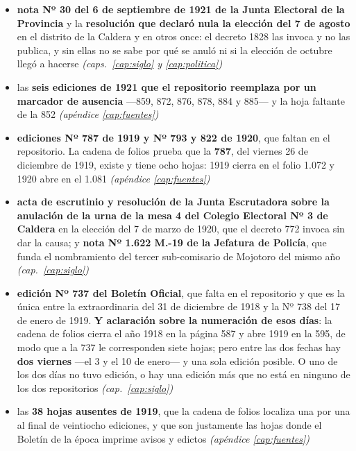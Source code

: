 \begin{itemize}[leftmargin=*]
\item \textbf{nota Nº 30 del 6 de septiembre de 1921 de la Junta Electoral de la Provincia} y la \textbf{resolución que declaró nula la elección del 7 de agosto} en el distrito de la Caldera y en otros once: el decreto 1828 las invoca y no las publica, y sin ellas no se sabe por qué se anuló ni si la elección de octubre llegó a hacerse \textit{(caps.\ \ref{cap:siglo} y \ref{cap:politica})}
\item las \textbf{seis ediciones de 1921 que el repositorio reemplaza por un marcador de ausencia} ---859, 872, 876, 878, 884 y 885--- y la hoja faltante de la 852 \textit{(apéndice \ref{cap:fuentes})}

\item \textbf{ediciones Nº 787 de 1919 y Nº 793 y 822 de 1920}, que faltan en el repositorio. La cadena de folios prueba que la \textbf{787}, del viernes 26 de diciembre de 1919, existe y tiene ocho hojas: 1919 cierra en el folio 1.072 y 1920 abre en el 1.081 \textit{(apéndice \ref{cap:fuentes})}
\item \textbf{acta de escrutinio y resolución de la Junta Escrutadora sobre la anulación de la urna de la mesa 4 del Colegio Electoral Nº 3 de Caldera} en la elección del 7 de marzo de 1920, que el decreto 772 invoca sin dar la causa; y \textbf{nota Nº 1.622 M.-19 de la Jefatura de Policía}, que funda el nombramiento del tercer sub-comisario de Mojotoro del mismo año \textit{(cap.\ \ref{cap:siglo})}

\item \textbf{edición Nº 737 del Boletín Oficial}, que falta en el repositorio y que es la única entre la extraordinaria del 31 de diciembre de 1918 y la Nº 738 del 17 de enero de 1919. \textbf{Y aclaración sobre la numeración de esos días}: la cadena de folios cierra el año 1918 en la página 587 y abre 1919 en la 595, de modo que a la 737 le corresponden siete hojas; pero entre las dos fechas hay \textbf{dos viernes} ---el 3 y el 10 de enero--- y una sola edición posible. O uno de los dos días no tuvo edición, o hay una edición más que no está en ninguno de los dos repositorios \textit{(cap.\ \ref{cap:siglo})}
\item las \textbf{38 hojas ausentes de 1919}, que la cadena de folios localiza una por una al final de veintiocho ediciones, y que son justamente las hojas donde el Boletín de la época imprime avisos y edictos \textit{(apéndice \ref{cap:fuentes})}


\end{itemize}
